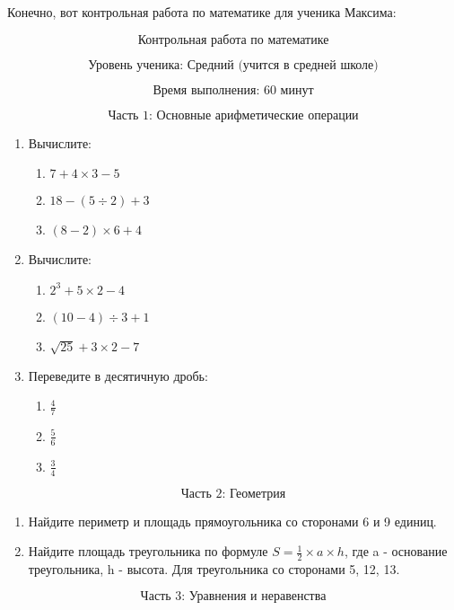 \documentclass{article}
\begin{document}
Конечно, вот контрольная работа по математике для ученика Максима:

\[
\text{Контрольная работа по математике}
\]

\[
\text{Уровень ученика: Средний (учится в средней школе)}
\]

\[
\text{Время выполнения: 60 минут}
\]

\[
\text{Часть 1: Основные арифметические операции}
\]

\begin{enumerate}
    \item Вычислите:
    \begin{enumerate}
        \item \(7 + 4 \times 3 - 5\)
        \item \(18 - (5 \div 2) + 3\)
        \item \((8 - 2) \times 6 + 4\)
    \end{enumerate}
    
    \item Вычислите:
    \begin{enumerate}
        \item \(2^3 + 5 \times 2 - 4\)
        \item \((10 - 4) \div 3 + 1\)
        \item \(\sqrt{25} + 3 \times 2 - 7\)
    \end{enumerate}
    
    \item Переведите в десятичную дробь:
    \begin{enumerate}
        \item \( \frac{4}{7} \)
        \item \( \frac{5}{6} \)
        \item \( \frac{3}{4} \)
    \end{enumerate}
\end{enumerate}

\[
\text{Часть 2: Геометрия}
\]

\begin{enumerate}
    \item Найдите периметр и площадь прямоугольника со сторонами 6 и 9 единиц.
    \item Найдите площадь треугольника по формуле \(S = \frac{1}{2} \times a \times h\), где a - основание треугольника, h - высота. Для треугольника со сторонами 5, 12, 13.
\end{enumerate}

\[
\text{Часть 3: Уравнения и неравенства}
\]
\end{document}
